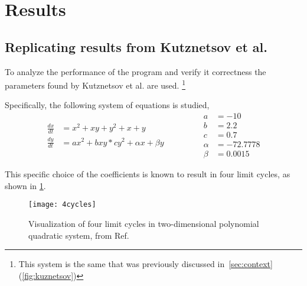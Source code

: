 
\section{Results}

\subsection{Replicating results from Kutznetsov et al.}

To analyze the performance of the program and verify it correctness the parameters found by Kutznetsov et al. \cite{kuznetsov_visualization_2013} are used. \footnote{This system is the same that was previously discussed in~\cref{sec:context} (\cref{fig:kuznetsov})}

Specifically, the following system of equations is studied,
\begin{equation}%
    \label{eq:kuznetsov}
    \begin{split}
        \frac{dx}{dt} &= x^2 + xy + y^2 + x + y\\
        \frac{dy}{dt} &= ax^2 + bxy * cy^2 + \alpha x + \beta y
    \end{split}
    \qquad \qquad
    \begin{split}
        a &= -10\\
        b &= 2.2\\
        c &= 0.7\\
        \alpha &= -72.7778\\
        \beta &= 0.0015
    \end{split}
\end{equation}

This specific choice of the coefficients is known to result in four limit
cycles, as shown in \cref{fig:kuznetsov2}.

\begin{figure}[H]
    \centering
    \texttt{[image: 4cycles]}
    \caption{Visualization of four limit cycles in two-dimensional polynomial quadratic system, from Ref.~\cite{kuznetsov_visualization_2013}
    }
    \label{fig:kuznetsov2}
\end{figure}

